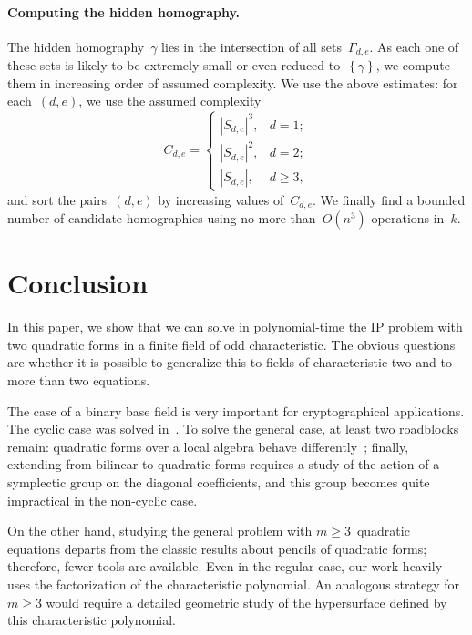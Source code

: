 \documentclass{article}%
\def\acco#1{\left\{#1\right\}}
\def\abs#1{\left|#1\right|}
\def\card#1{\abs{#1}}
\begin{document}
\paragraph{Computing the hidden homography.}

The hidden homography~$γ$ lies in the intersection of all sets~$Γ_{d,e}$.
As each one of these sets is likely to be extremely small or even reduced
to~$\acco{γ}$, we compute them in increasing order of assumed complexity.
We use the above estimates: for each~$(d,e)$, we use the assumed complexity
\begin{equation}
C_{d,e} = \begin{cases}
\card{S_{d,e}}^3,& d = 1;\\
\card{S_{d,e}}^2,& d = 2;\\
\card{S_{d,e}},& d≥ 3,
\end{cases}
\end{equation}
and sort the pairs~$(d,e)$ by increasing values of~$C_{d,e}$. We finally
find a bounded number of candidate homographies using no more
than~$O(n^3)$ operations in~$k$.

\section*{Conclusion}

In this paper, we show that we can solve in polynomial-time the IP
problem with two quadratic forms in a finite field of odd characteristic.
The obvious questions are whether it is possible to generalize this to
fields of characteristic two and to more than two equations.

The case of a binary base field is very important for cryptographical
applications. The cyclic case was solved in~\cite{MPG2013}. To solve
the general case, at least two roadblocks remain:
quadratic
forms over a local algebra behave differently~\cite[§93]{omeara};
finally, extending from bilinear to quadratic forms requires a study of
the action of a symplectic group on the diagonal coefficients, and this
group becomes quite impractical in the non-cyclic case.

On the other hand, studying the general problem with $m ≥ 3$~quadratic
equations departs from the classic results about pencils of quadratic
forms; therefore, fewer tools are available. Even in the regular
case, our work heavily uses the factorization of the characteristic
polynomial. An analogous strategy for~$m ≥ 3$ would require a detailed
geometric study of the hypersurface defined by this characteristic
polynomial.
\end{document}
